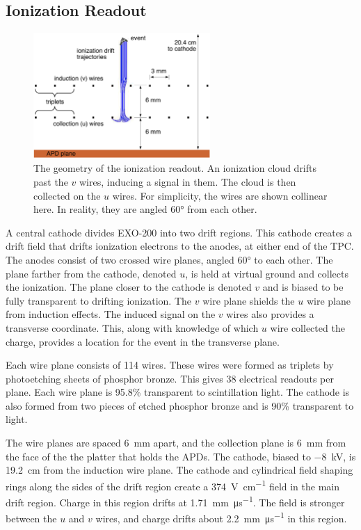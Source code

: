 \documentclass[herrin-thesis.tex]{subfiles}
\begin{document}
\subsection{Ionization Readout}

\begin{figure}
\centering
\includegraphics[width=0.6\textwidth]{./figures/detector_wire_geometry.pdf}
\caption[Geometry of the ionization readout wire planes]{The geometry of the ionization readout. An ionization cloud drifts past the \(v\) wires, inducing a signal in them. The cloud is then collected on the \(u\) wires. For simplicity, the wires are shown collinear here. In reality, they are angled \ang{60} from each other.}
\label{fig:detector_wire_geometry}
\end{figure}

A central cathode divides EXO-200 into two drift regions. This cathode creates a drift field that drifts ionization electrons to the anodes, at either end of the TPC. The anodes consist of two crossed wire planes, angled \ang{60} to each other. The plane farther from the cathode, denoted \(u\), is held at virtual ground and collects the ionization. The plane closer to the cathode is denoted \(v\) and is biased to be fully transparent to drifting ionization. The \(v\) wire plane shields the \(u\) wire plane from induction effects. The induced signal on the \(v\) wires also provides a transverse coordinate. This, along with knowledge of which \(u\) wire collected the charge, provides a location for the event in the transverse plane.

Each wire plane consists of 114 wires. These wires were formed as triplets by photoetching sheets of phosphor bronze. This gives 38 electrical readouts per plane. Each wire plane is 95.8\% transparent to scintillation light. The cathode is also formed from two pieces of etched phosphor bronze and is 90\% transparent to light.

The wire planes are spaced \SI{6}{\mm} apart, and the collection plane is \SI{6}{\mm} from the face of the the platter that holds the APDs. The cathode, biased to \SI{-8}{\kV}, is \SI{19.2}{\cm} from the induction wire plane. The cathode and cylindrical field shaping rings along the sides of the drift region create a \SI{374}{\V\per\cm} field in the main drift region. Charge in this region drifts at \SI{1.71}{\mm\per\micro\s}. The field is stronger between the \(u\) and \(v\) wires, and charge drifts about \SI{2.2}{\mm\per\micro\s} in this region.
\end{document}
